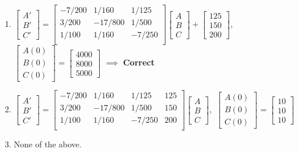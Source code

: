 \documentclass[11pt]{article}
\begin{document}
\begin{enumerate}
\begin{enumerate}
					
					\item \(\begin{bmatrix}
							A' \\ B' \\ C'
						 \end{bmatrix}=\begin{bmatrix}
										-7/200 & 1/160 & 1/125 \\
										3/200 & -17/800 & 1/500 \\
										1/100 & 1/160 & -7/250 \\
						 			\end{bmatrix}												\begin{bmatrix}
										A \\ B \\ C
									\end{bmatrix}+													\begin{bmatrix}
											125 \\ 150 \\ 200													\end{bmatrix}\),\ \(\begin{bmatrix}
										A(0) \\ B(0) \\ C(0)
									\end{bmatrix}=												\begin{bmatrix}
										4000 \\ 8000 \\ 5000
									\end{bmatrix}\)	 $\implies$ \textbf{Correct}
					
					\item \(\begin{bmatrix}
							A' \\ B' \\ C'
						 \end{bmatrix}=\begin{bmatrix}
										-7/200 & 1/160 & 1/125 & 125 \\
										3/200 & -17/800 & 1/500 & 150 \\
										1/100 & 1/160 & -7/250 & 200 \\
						 			\end{bmatrix}												\begin{bmatrix}
										A \\ B \\ C
									\end{bmatrix}\),\ \(\begin{bmatrix}
										A(0) \\ B(0) \\ C(0)
									\end{bmatrix}=												\begin{bmatrix}
										10 \\ 10 \\ 10
									\end{bmatrix}\)																	
					\item None of the above.
				\end{enumerate}


\end{enumerate}
\end{document}
